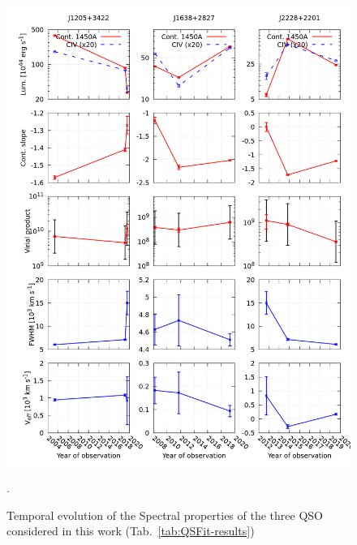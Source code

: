 \documentclass{article}
\begin{document}
\begin{figure}
  \centering
  \includegraphics[width=\textwidth]{QSFit-results}
   \vspace{-12pt}
   \caption{Temporal evolution of the Spectral properties of the three QSO considered in this work (Tab.~\ref{tab:QSFit-results})}.
     \label{fig:QSFit-results}
\end{figure}
\end{document}
